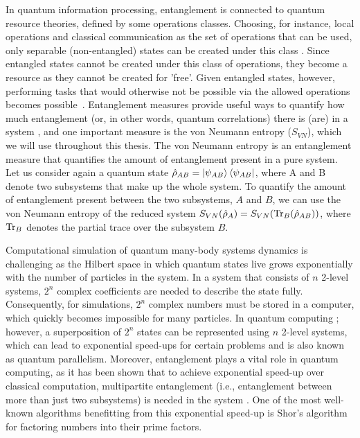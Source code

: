 In quantum information processing, entanglement is connected to quantum resource theories, defined by some operations classes. Choosing, for instance, local operations and classical communication as the set of operations that can be used, only separable (non-entangled) states can be created under this class \cite{horodecki2013}. Since entangled states cannot be created under this class of operations, they become a resource as they cannot be created for 'free'. Given entangled states, however, performing tasks that would otherwise not be possible via the allowed operations becomes possible~\cite{nielsen,horodecki2009,horodecki2013}. Entanglement measures provide useful ways to quantify how much entanglement (or, in other words, quantum correlations) there is (are) in a system \cite{plenio2006}, and one important measure is the von Neumann entropy ($S_{VN}$), which we will use throughout this thesis. The von Neumann entropy is an entanglement measure that quantifies the amount of entanglement present in a pure system. Let us consider again a quantum state $\hat{\rho}_{AB} = \ket{\psi_{AB}}\bra{\psi_{AB}}$, where A and B denote two subsystems that make up the whole system. To quantify the amount of entanglement present between the two subsystems, $A$ and $B$, we can use the von Neumann entropy of the reduced system $S_{VN}(\hat{\rho}_A) = S_{VN}(\Tr_B(\hat{\rho}_{AB}))$, where $\Tr_B$ denotes the partial trace over the subsystem $B$. 

Computational simulation of quantum many-body systems dynamics is challenging as the Hilbert space in which quantum states live grows exponentially with the number of particles in the system. In a system that consists of $n$ 2-level systems, $2^n$ complex coefficients are needed to describe the state fully. Consequently, for simulations, $2^n$ complex numbers must be stored in a computer, which quickly becomes impossible for many particles. In quantum computing \cite{forcer2002, nandhini2022}; however, a superposition of $2^n$ states can be represented using $n$ 2-level systems, which can lead to exponential speed-ups for certain problems and is also known as quantum parallelism. Moreover, entanglement plays a vital role in quantum computing, as it has been shown that to achieve exponential speed-up over classical computation, multipartite entanglement (i.e., entanglement between more than just two subsystems) is needed in the system \cite{jozsa2003}. One of the most well-known algorithms benefitting from this exponential speed-up is Shor's algorithm for factoring numbers into their prime factors\cite{shor1997}.


